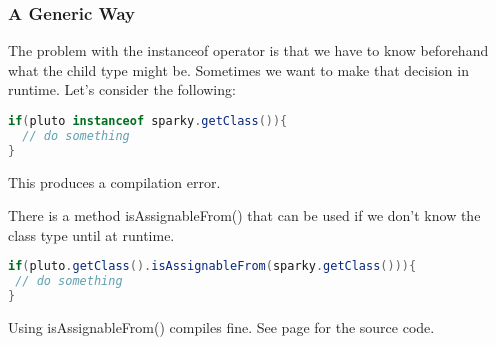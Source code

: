 \subsubsection{A Generic Way}

The problem with the instanceof operator is that we have to know beforehand what the child type might be. Sometimes we want to make that decision in runtime. Let's consider the following:

\begin{lstlisting}[language=Java]
if(pluto instanceof sparky.getClass()){
  // do something
}
\end{lstlisting}

This produces a compilation error. 

There is a method isAssignableFrom() that can be used if we don't know the class type until at runtime.
\begin{lstlisting}[language=Java]
if(pluto.getClass().isAssignableFrom(sparky.getClass())){
 // do something
}
\end{lstlisting}

Using isAssignableFrom() compiles fine. See page \pageref{App:AppendixM} for the source code.